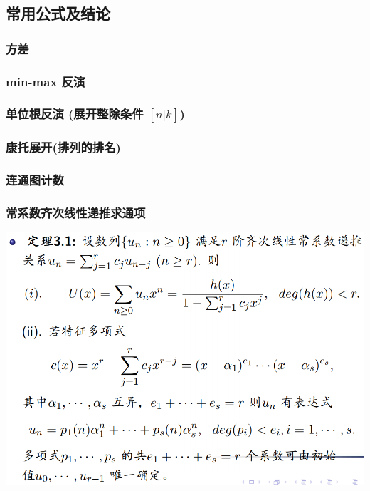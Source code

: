 \documentclass[a4paper, twoside]{article}
\begin{document}
\begin{multicols}{2}
			\subsection{常用公式及结论}
				\subsubsection{方差}
					
				
				\subsubsection{min-max 反演}
					
				
				\subsubsection{单位根反演 (展开整除条件 $[n|k]$)}
					
				
				\subsubsection{康托展开(排列的排名)}
					
				
				\subsubsection{连通图计数}
					

				\subsubsection{常系数齐次线性递推求通项}
					\includegraphics[scale = 0.265]{../src/math/线性齐次线性常系数递推.png}
			

\end{multicols}
\end{document}
